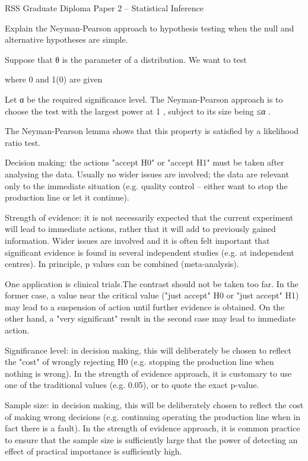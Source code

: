  
RSS Graduate Diploma Paper 2 – Statistical Inference
 
 

Explain the Neyman-Pearson approach to hypothesis testing when the null and alternative hypotheses are simple.
 
Suppose that θ is the parameter of a distribution. We want to test
 

 
where 0 and 1(0) are given
 
Let α be the required significance level. The Neyman-Pearson approach is to choose
the test with the largest power at 1 , subject to its size being ≤α .
 
The Neyman-Pearson lemma shows that this property is satisfied by a likelihood ratio test.


Decision making: the actions "accept
H0" or "accept H1" must be taken after
analysing the data. Usually no wider issues are involved; the data are relevant only to
the immediate situation (e.g. quality control – either want to stop the production line
or let it continue).
 
Strength of evidence: it is not necessarily expected that the current experiment will
lead to immediate actions, rather that it will add to previously gained information.
Wider issues are involved and it is often felt important that significant evidence is
found in several independent studies (e.g. at independent centres). In principle,
p values can be combined (meta-analysis).
 
One application is clinical trials.The contrast should not be taken too far. In the former case, a value near the critical value ("just accept" H0 or "just accept" H1) may lead to a suspension of action until
further evidence is obtained. On the other hand, a "very significant" result in the
second case may lead to immediate action.
 
Significance level: in decision making, this will deliberately be chosen to reflect the
"cost" of wrongly rejecting H0 (e.g. stopping the production line when nothing is
wrong). In the strength of evidence approach, it is customary to use one of the
traditional values (e.g. 0.05), or to quote the exact p-value.
 
Sample size: in decision making, this will be deliberately chosen to reflect the cost of
making wrong decisions (e.g. continuing operating the production line when in fact
there is a fault). In the strength of evidence approach, it is common practice to ensure
that the sample size is sufficiently large that the power of detecting an effect of
practical importance is sufficiently high.
